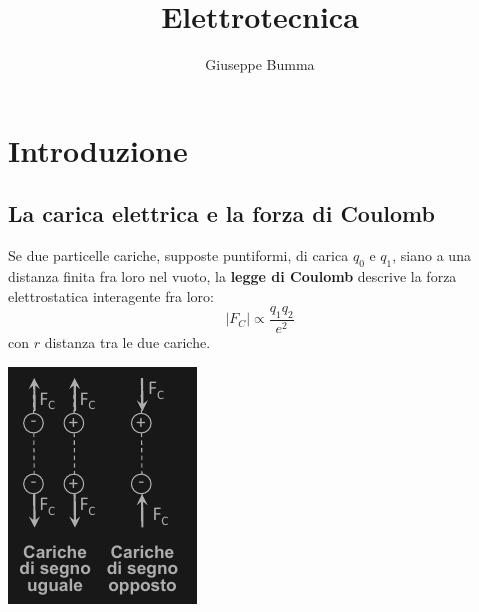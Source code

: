 \documentclass{article}
\title{Elettrotecnica}
\author{Giuseppe Bumma}
\begin{document}
\newcommand{\R}{\mathbb{R}}
\newcommand{\bb}[1]{\mathbb{#1}}
\newcommand{\cc}[1]{\mathcal{#1}}
\newcommand{ \lognormal }{\text{Lognormal} }
\newcommand{\tb}[1]{\textbf{#1}}
\newcommand*\circled[1]{\tikz[baseline=(char.base)]{%
            \node[shape=circle,draw,inner sep=2pt] (char) {#1};}}


\tableofcontents

\maketitle

\section{Introduzione}

\subsection{La carica elettrica e la forza di Coulomb}
Se due particelle cariche, supposte puntiformi, di carica $q_0$ e $q_1$, siano a una distanza finita fra loro nel vuoto, la \textbf{legge di Coulomb} descrive la forza elettrostatica interagente fra loro:
\[
    |F_C| \propto \frac{q_1q_2}{e^2}
\]
con $r$ distanza tra le due cariche.

\begin{center}
    \includegraphics[scale=0.5]{Image/Forza di Coulomb.png}
\end{center}
\end{document}
